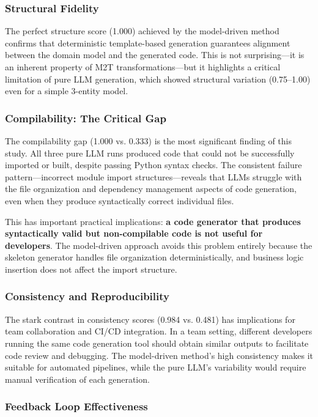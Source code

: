 \documentclass[11pt,a4paper]{article}
\begin{document}
\subsubsection{Structural Fidelity}

The perfect structure score (1.000) achieved by the model-driven method confirms that deterministic template-based generation guarantees alignment between the domain model and the generated code. This is not surprising---it is an inherent property of M2T transformations---but it highlights a critical limitation of pure LLM generation, which showed structural variation (0.75--1.00) even for a simple 3-entity model.

\subsubsection{Compilability: The Critical Gap}

The compilability gap (1.000 vs. 0.333) is the most significant finding of this study. All three pure LLM runs produced code that could not be successfully imported or built, despite passing Python syntax checks. The consistent failure pattern---incorrect module import structures---reveals that LLMs struggle with the file organization and dependency management aspects of code generation, even when they produce syntactically correct individual files.

This has important practical implications: \textbf{a code generator that produces syntactically valid but non-compilable code is not useful for developers}. The model-driven approach avoids this problem entirely because the skeleton generator handles file organization deterministically, and business logic insertion does not affect the import structure.

\subsubsection{Consistency and Reproducibility}

The stark contrast in consistency scores (0.984 vs. 0.481) has implications for team collaboration and CI/CD integration. In a team setting, different developers running the same code generation tool should obtain similar outputs to facilitate code review and debugging. The model-driven method's high consistency makes it suitable for automated pipelines, while the pure LLM's variability would require manual verification of each generation.

\subsubsection{Feedback Loop Effectiveness}
\end{document}
